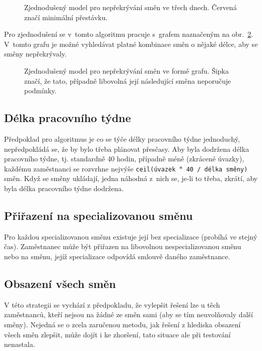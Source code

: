 \documentclass[twoside]{ctuthesis}
\begin{document}
\begin{figure}[h!]
	
	\caption{Zjednodušený model pro nepřekrývání směn ve třech dnech. Červená značí minimální přestávku.}
	\label{fig:shiftprecedencefull}
\end{figure}

Pro zjednodušení se v~tomto algoritmu pracuje s~grafem naznačeným na obr.~\ref{fig:shiftprecedence}. V~tomto grafu je možné vyhledávat platné kombinace směn o nějaké délce, aby se směny nepřekrývaly.

\begin{figure}[h!]
	
	\caption{Zjednodušený model pro nepřekrývání směn ve formě grafu. Šipka značí, že tato, případně libovolná její následující směna neporučuje podmínky.}
	\label{fig:shiftprecedence}
\end{figure}


\subsection{Délka pracovního týdne}
Předpoklad pro algoritmus je co se týče délky pracovního týdne jednoduchý, nepředpokládá se, že by bylo třeba plánovat přesčasy. Aby byla dodržena délka pracovního týdne, tj. standardně 40 hodin, případně méně (zkrácené úvazky), každému zaměstnanci se rozvrhne nejvýše \texttt{ceil(úvazek $\ast$ 40 / délka směny)} směn. Když se směny ukládají, jedna náhodná z~nich se, je-li to třeba, zkrátí, aby byla délka pracovního týdne dodržena.

\subsection{Přiřazení na specializovanou směnu}

Pro každou specializovanou směnu existuje její  bez specializace (probíhá ve stejný čas). Zaměstnanec může být přiřazen na libovolnou nespecializovanou směnu nebo na směnu, jejíž specializace odpovídá smlouvě daného zaměstnance.

\subsection{Obsazení všech směn}
V této strategii se vychází z předpokladu, že vylepšit řešení lze u těch zaměstnanců, kteří nejsou na žádné ze směn sami (aby se tím neuvolňovaly další směny). Nejedná se o zcela zaručenou metodu, jak řešení z hlediska obsazení všech směn zlepšit, může dojít i ke zhoršení, tato situace ale při testování nenastala.
\end{document}
